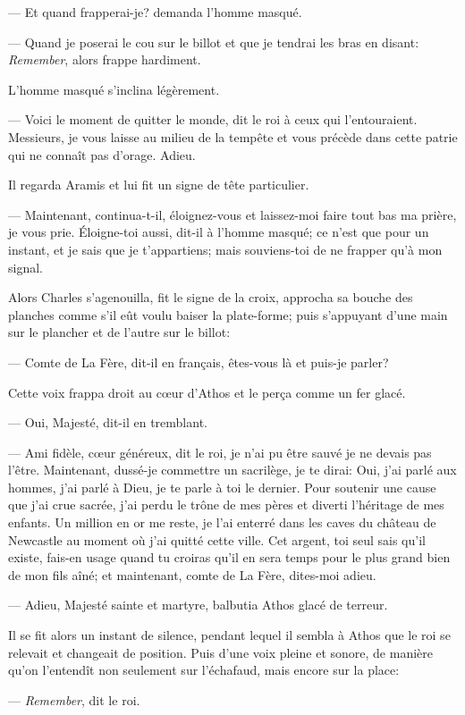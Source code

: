 — Et quand frapperai-je? demanda l'homme masqué.

— Quand je poserai le cou sur le billot et que je tendrai les bras en disant: \textit{Remember}, alors frappe hardiment.

L'homme masqué s'inclina légèrement.

— Voici le moment de quitter le monde, dit le roi à ceux qui l'entouraient. Messieurs, je vous laisse au milieu de la tempête et vous précède dans cette patrie qui ne connaît pas d'orage. Adieu.

Il regarda Aramis et lui fit un signe de tête particulier.

— Maintenant, continua-t-il, éloignez-vous et laissez-moi faire tout bas ma prière, je vous prie. Éloigne-toi aussi, dit-il à l'homme masqué; ce n'est que pour un instant, et je sais que je t'appartiens; mais souviens-toi de ne frapper qu'à mon signal.

Alors Charles s'agenouilla, fit le signe de la croix, approcha sa bouche des planches comme s'il eût voulu baiser la plate-forme; puis s'appuyant d'une main sur le plancher et de l'autre sur le billot:

— Comte de La Fère, dit-il en français, êtes-vous là et puis-je parler?

Cette voix frappa droit au cœur d'Athos et le perça comme un fer glacé.

— Oui, Majesté, dit-il en tremblant.

— Ami fidèle, cœur généreux, dit le roi, je n'ai pu être sauvé je ne devais pas l'être. Maintenant, dussé-je commettre un sacrilège, je te dirai: Oui, j'ai parlé aux hommes, j'ai parlé à Dieu, je te parle à toi le dernier. Pour soutenir une cause que j'ai crue sacrée, j'ai perdu le trône de mes pères et diverti l'héritage de mes enfants. Un million en or me reste, je l'ai enterré dans les caves du château de Newcastle au moment où j'ai quitté cette ville. Cet argent, toi seul sais qu'il existe, fais-en usage quand tu croiras qu'il en sera temps pour le plus grand bien de mon fils aîné; et maintenant, comte de La Fère, dites-moi adieu.

— Adieu, Majesté sainte et martyre, balbutia Athos glacé de terreur.

Il se fit alors un instant de silence, pendant lequel il sembla à Athos que le roi se relevait et changeait de position.
Puis d'une voix pleine et sonore, de manière qu'on l'entendît non seulement sur l'échafaud, mais encore sur la place:

— \textit{Remember}, dit le roi.


